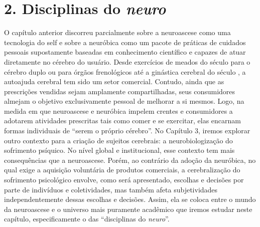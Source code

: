 \chapter{2. Disciplinas do \emph{neuro}}

O capítulo anterior discorreu parcialmente sobre a neuroascese como uma
tecnologia do self e sobre a neuróbica como um pacote de práticas de
cuidados pessoais supostamente baseadas em conhecimento científico e
capazes de atuar diretamente no cérebro do usuário. Desde exercícios de
meados do século  para o cérebro duplo ou para órgãos frenológicos
até a ginástica cerebral do século , a autoajuda cerebral tem sido um
setor comercial. Contudo, ainda que as prescrições vendidas sejam
amplamente compartilhadas, seus consumidores almejam o objetivo
exclusivamente pessoal de melhorar a si mesmos. Logo, na medida em que
neuroascese e neuróbica impelem crentes e consumidores a adotarem
atividades prescritas tais como comer e se exercitar, elas encarnam
formas individuais de ``serem o próprio cérebro''. No Capítulo 3, iremos
explorar outro contexto para a criação de sujeitos cerebrais: a
neurobiologização do sofrimento psíquico. No nível global e
institucional, esse contexto tem mais consequências que a neuroascese.
Porém, ao contrário da adoção da neuróbica, no qual exige a aquisição
voluntária de produtos comerciais, a cerebralização do sofrimento
psicológico envolve, como será apresentado, escolhas e decisões por
parte de indivíduos e coletividades, mas também afeta subjetividades
independentemente dessas escolhas e decisões. Assim, ela se coloca entre
o mundo da neuroascese e o universo mais puramente acadêmico que iremos
estudar neste capítulo, especificamente o das ``disciplinas do
\emph{neuro}''.

